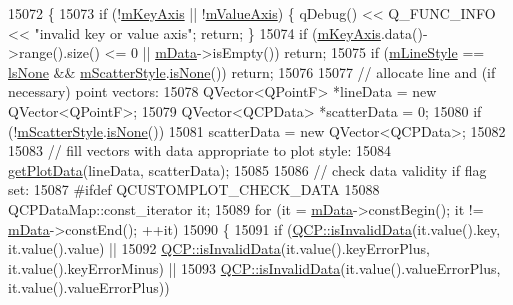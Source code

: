\begin{DoxyCode}
15072 \{
15073   \textcolor{keywordflow}{if} (!\hyperlink{class_q_c_p_abstract_plottable_a426f42e254d0f8ce5436a868c61a6827}{mKeyAxis} || !\hyperlink{class_q_c_p_abstract_plottable_a2901452ca4aea911a1827717934a4bda}{mValueAxis}) \{ qDebug() << Q\_FUNC\_INFO << \textcolor{stringliteral}{"invalid key or value axis"};
       \textcolor{keywordflow}{return}; \}
15074   \textcolor{keywordflow}{if} (\hyperlink{class_q_c_p_abstract_plottable_a426f42e254d0f8ce5436a868c61a6827}{mKeyAxis}.data()->range().size() <= 0 || \hyperlink{class_q_c_p_graph_a8457c840f69a0ac49f61d30a509c5d08}{mData}->isEmpty()) \textcolor{keywordflow}{return};
15075   \textcolor{keywordflow}{if} (\hyperlink{class_q_c_p_graph_a8604fd98402035a63375849f7341ee25}{mLineStyle} == \hyperlink{class_q_c_p_graph_ad60175cd9b5cac937c5ee685c32c0859aea9591b933733cc7b20786b71e60fa04}{lsNone} && \hyperlink{class_q_c_p_graph_a4aa36241f166ccd1f75fc8f24e4a3247}{mScatterStyle}.\hyperlink{class_q_c_p_scatter_style_aa3861281108d0adbeb291c820ea3925c}{isNone}()) \textcolor{keywordflow}{return};
15076   
15077   \textcolor{comment}{// allocate line and (if necessary) point vectors:}
15078   QVector<QPointF> *lineData = \textcolor{keyword}{new} QVector<QPointF>;
15079   QVector<QCPData> *scatterData = 0;
15080   \textcolor{keywordflow}{if} (!\hyperlink{class_q_c_p_graph_a4aa36241f166ccd1f75fc8f24e4a3247}{mScatterStyle}.\hyperlink{class_q_c_p_scatter_style_aa3861281108d0adbeb291c820ea3925c}{isNone}())
15081     scatterData = \textcolor{keyword}{new} QVector<QCPData>;
15082   
15083   \textcolor{comment}{// fill vectors with data appropriate to plot style:}
15084   \hyperlink{class_q_c_p_graph_a466c661e015188971c862031af946693}{getPlotData}(lineData, scatterData);
15085   
15086   \textcolor{comment}{// check data validity if flag set:}
15087 \textcolor{preprocessor}{#ifdef QCUSTOMPLOT\_CHECK\_DATA}
15088   QCPDataMap::const\_iterator it;
15089   \textcolor{keywordflow}{for} (it = \hyperlink{class_q_c_p_graph_a8457c840f69a0ac49f61d30a509c5d08}{mData}->constBegin(); it != \hyperlink{class_q_c_p_graph_a8457c840f69a0ac49f61d30a509c5d08}{mData}->constEnd(); ++it)
15090   \{
15091     \textcolor{keywordflow}{if} (\hyperlink{namespace_q_c_p_a07ab701c05329089f933b9cae2638a63}{QCP::isInvalidData}(it.value().key, it.value().value) ||
15092         \hyperlink{namespace_q_c_p_a07ab701c05329089f933b9cae2638a63}{QCP::isInvalidData}(it.value().keyErrorPlus, it.value().keyErrorMinus) ||
15093         \hyperlink{namespace_q_c_p_a07ab701c05329089f933b9cae2638a63}{QCP::isInvalidData}(it.value().valueErrorPlus, it.value().valueErrorPlus))

\end{DoxyCode}
